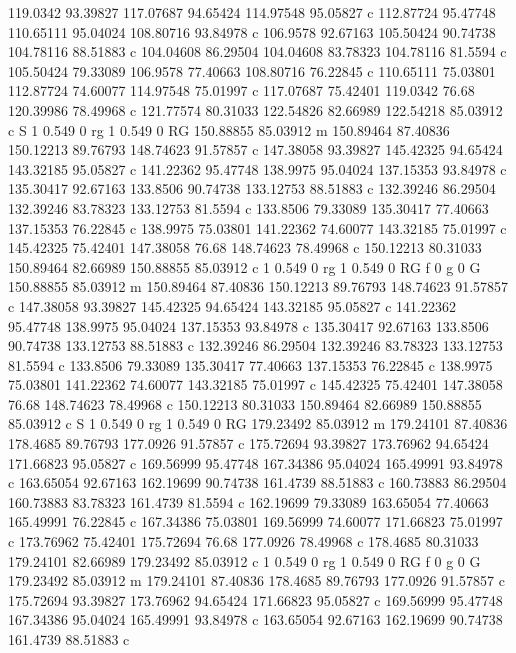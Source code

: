 119.0342 93.39827 
117.07687 94.65424 
114.97548 95.05827 c 
112.87724 95.47748 
110.65111 95.04024 
108.80716 93.84978 c 
106.9578 92.67163 
105.50424 90.74738 
104.78116 88.51883 c 
104.04608 86.29504 
104.04608 83.78323 
104.78116 81.5594 c 
105.50424 79.33089 
106.9578 77.40663 
108.80716 76.22845 c 
110.65111 75.03801 
112.87724 74.60077 
114.97548 75.01997 c 
117.07687 75.42401 
119.0342 76.68 
120.39986 78.49968 c 
121.77574 80.31033 
122.54826 82.66989 
122.54218 85.03912 c 
S 
1 0.549 0 rg 1 0.549 0 RG 
150.88855 85.03912 m 
150.89464 87.40836 
150.12213 89.76793 
148.74623 91.57857 c 
147.38058 93.39827 
145.42325 94.65424 
143.32185 95.05827 c 
141.22362 95.47748 
138.9975 95.04024 
137.15353 93.84978 c 
135.30417 92.67163 
133.8506 90.74738 
133.12753 88.51883 c 
132.39246 86.29504 
132.39246 83.78323 
133.12753 81.5594 c 
133.8506 79.33089 
135.30417 77.40663 
137.15353 76.22845 c 
138.9975 75.03801 
141.22362 74.60077 
143.32185 75.01997 c 
145.42325 75.42401 
147.38058 76.68 
148.74623 78.49968 c 
150.12213 80.31033 
150.89464 82.66989 
150.88855 85.03912 c 
1 0.549 0 rg 1 0.549 0 RG f 
0 g 0 G 
150.88855 85.03912 m 
150.89464 87.40836 
150.12213 89.76793 
148.74623 91.57857 c 
147.38058 93.39827 
145.42325 94.65424 
143.32185 95.05827 c 
141.22362 95.47748 
138.9975 95.04024 
137.15353 93.84978 c 
135.30417 92.67163 
133.8506 90.74738 
133.12753 88.51883 c 
132.39246 86.29504 
132.39246 83.78323 
133.12753 81.5594 c 
133.8506 79.33089 
135.30417 77.40663 
137.15353 76.22845 c 
138.9975 75.03801 
141.22362 74.60077 
143.32185 75.01997 c 
145.42325 75.42401 
147.38058 76.68 
148.74623 78.49968 c 
150.12213 80.31033 
150.89464 82.66989 
150.88855 85.03912 c 
S 
1 0.549 0 rg 1 0.549 0 RG 
179.23492 85.03912 m 
179.24101 87.40836 
178.4685 89.76793 
177.0926 91.57857 c 
175.72694 93.39827 
173.76962 94.65424 
171.66823 95.05827 c 
169.56999 95.47748 
167.34386 95.04024 
165.49991 93.84978 c 
163.65054 92.67163 
162.19699 90.74738 
161.4739 88.51883 c 
160.73883 86.29504 
160.73883 83.78323 
161.4739 81.5594 c 
162.19699 79.33089 
163.65054 77.40663 
165.49991 76.22845 c 
167.34386 75.03801 
169.56999 74.60077 
171.66823 75.01997 c 
173.76962 75.42401 
175.72694 76.68 
177.0926 78.49968 c 
178.4685 80.31033 
179.24101 82.66989 
179.23492 85.03912 c 
1 0.549 0 rg 1 0.549 0 RG f 
0 g 0 G 
179.23492 85.03912 m 
179.24101 87.40836 
178.4685 89.76793 
177.0926 91.57857 c 
175.72694 93.39827 
173.76962 94.65424 
171.66823 95.05827 c 
169.56999 95.47748 
167.34386 95.04024 
165.49991 93.84978 c 
163.65054 92.67163 
162.19699 90.74738 
161.4739 88.51883 c 
